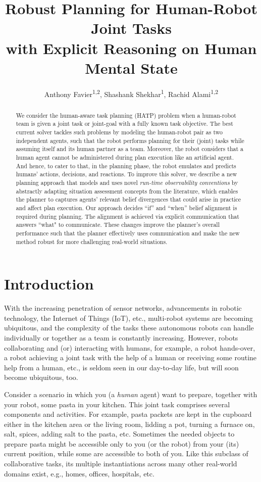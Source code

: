 \documentclass[letterpaper]{article} %
\title
{
Robust Planning for Human-Robot Joint Tasks \\ with Explicit Reasoning on Human Mental State
}
\author{
    Anthony Favier\textsuperscript{\rm 1,2},
    Shashank Shekhar\textsuperscript{\rm 1},
    Rachid Alami\textsuperscript{\rm 1,2}
}
\begin{document}


\maketitle

\begin{abstract}
% 
We consider the human-aware task planning (HATP) problem when a human-robot team is given a joint task or joint-goal with a fully known task objective. 
The best current solver tackles such problems by modeling the human-robot pair as two independent agents, such that the robot performs planning for their (joint) tasks while assuming itself and its human partner as a team.
Moreover, the robot considers that a human agent cannot be administered during plan execution like an artificial agent. And hence, to cater to that, in the planning phase, the robot emulates and predicts humans' actions, decisions, and reactions. 
To improve this solver, we describe a new planning approach that models and uses novel {\em run-time observability conventions} by abstractly adapting  situation assessment concepts from the literature, which enables the planner to 
captures agents' relevant belief divergences that could arise in practice and affect plan execution. 
Our approach decides ``if'' and ``when'' belief alignment is required during planning. The alignment is achieved via explicit communication that answers ``what" to communicate.
These changes improve the planner's overall performance such that the planner effectively uses communication and make the new method robust for more challenging real-world situations.  
\end{abstract}

\section{Introduction}
With the increasing penetration of sensor networks, advancements in robotic technology, the Internet of Things (IoT), etc., multi-robot systems are becoming ubiquitous, and the complexity of the tasks these autonomous robots can handle individually or together as a team is constantly increasing.
However, robots collaborating and (or) interacting with humans, for example, a robot hands-over, a robot achieving a joint task with the help of a human or receiving some routine help from a human, etc., is seldom seen in our day-to-day life, but will soon become ubiquitous, too.   

Consider a scenario in which you (a \textit{human} agent) want to prepare, together with your robot, some pasta in your kitchen. This joint task comprises several components and activities. For example, pasta packets are kept in the cupboard either in the kitchen area or the living room, lidding a pot, turning a furnace on, salt, spices, adding salt to the pasta, etc. 
Sometimes the needed objects to prepare pasta might be accessible only to you (or the robot) from your (its) current position, while some are accessible to both of you. 
Like this subclass of collaborative tasks, its multiple instantiations across many other real-world domains exist, e.g., homes, offices, hospitals, etc.
\end{document}
